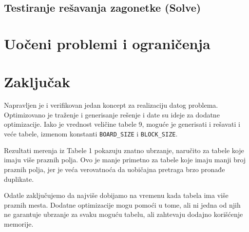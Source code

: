 \documentclass[a4paper]{article}
\begin{document}
    \subsection{Testiranje rešavanja zagonetke (Solve)}

    \newpage
    \section{Uočeni problemi i ograničenja}
    \newpage
    \section{Zaključak}
    Napravljen je i verifikovan jedan koncept za realizaciju datog problema. Optimizovano je traženje i generisanje rešenje i date su ideje za 
    dodatne optimizacije. Iako je vrednost veličine tabele 9, moguće je generisati i rešavati i veće tabele, izmenom konstanti \texttt{BOARD\_SIZE} i \texttt{BLOCK\_SIZE}. 
    \par Rezultati merenja iz Tabele 1 pokazuju znatno ubrzanje, naručito za tabele koje imaju više praznih polja. Ovo je manje primetno za tabele koje imaju 
    manji broj praznih polja, jer je veća verovatnoća da uobičajna pretraga brzo pronađe duplikate. 
    \par Odatle zaključujemo da najviše dobijamo na vremenu kada tabela ima više praznih mesta. Dodatne optimizacije mogu pomoći u tome, ali ni jedna od njih ne 
    garantuje ubrzanje za svaku moguću tabelu, ali zahtevaju dodajno korišćenje memorije.
    \newpage
\end{document}
